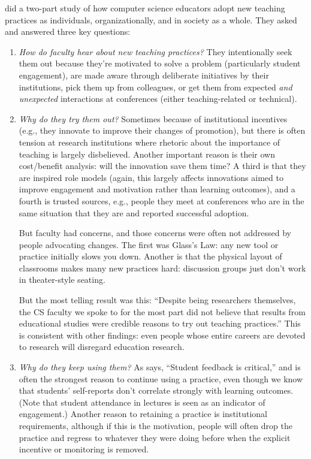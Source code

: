 \cite{Bark2015} did a two-part study of how computer science educators
adopt new teaching practices as individuals, organizationally, and in
society as a whole.  They asked and answered three key questions:

\begin{enumerate}

\item
  \emph{How do faculty hear about new teaching practices?}  They
  intentionally seek them out because they're motivated to solve a
  problem (particularly student engagement), are made aware through
  deliberate initiatives by their institutions, pick them up from
  colleagues, or get them from expected \emph{and unexpected}
  interactions at conferences (either teaching-related or technical).

\item
  \emph{Why do they try them out?}  Sometimes because of institutional
  incentives (e.g., they innovate to improve their changes of
  promotion), but there is often tension at research institutions
  where rhetoric about the importance of teaching is largely
  disbelieved.  Another important reason is their own cost/benefit
  analysis: will the innovation save them time?  A third is that they
  are inspired role models (again, this largely affects innovations
  aimed to improve engagement and motivation rather than learning
  outcomes), and a fourth is trusted sources, e.g., people they meet
  at conferences who are in the same situation that they are and
  reported successful adoption.

  But faculty had concerns, and those concerns were often not
  addressed by people advocating changes.  The first was Glass's Law:
  any new tool or practice initially slows you down.  Another is that
  the physical layout of classrooms makes many new practices hard:
  discussion groups just don't work in theater-style seating.

  But the most telling result was this: ``Despite being researchers
  themselves, the CS faculty we spoke to for the most part did not
  believe that results from educational studies were credible reasons
  to try out teaching practices.'' This is consistent with other
  findings: even people whose entire careers are devoted to research
  will disregard education research.

\item
  \emph{Why do they keep using them?}  As \cite{Bark2015} says,
  ``Student feedback is critical,'' and is often the strongest reason
  to continue using a practice, even though we know that students'
  self-reports don't correlate strongly with learning outcomes.  (Note
  that student attendance in lectures is seen as an indicator of
  engagement.)  Another reason to retaining a practice is
  institutional requirements, although if this is the motivation,
  people will often drop the practice and regress to whatever they
  were doing before when the explicit incentive or monitoring is
  removed.

\end{enumerate}

